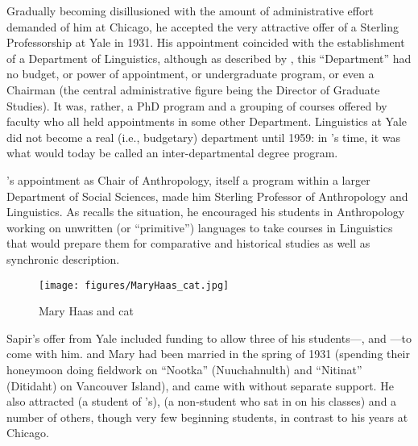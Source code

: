 Gradually becoming disillusioned with the amount of administrative
effort demanded of him at Chicago, he accepted the very attractive
offer of a Sterling Professorship at Yale in 1931. His appointment
coincided with the establishment of a Department of Linguistics,
although as described by \citet{wells74:lx-at-yale}, this
``Department'' had no budget, or power of appointment, or
undergraduate program, or even a Chairman (the central administrative
figure being the Director of Graduate Studies). It was, rather, a PhD
program and a grouping of courses offered by faculty who all held
appointments in some other Department.  Linguistics at Yale did not
become a real (i.e., budgetary) department until 1959: in {\Sapir}'s
time, it was what would today be called an inter-departmental degree
program.

{\Sapir}'s appointment as Chair of Anthropology, itself a program within
a larger Department of Social Sciences, made him Sterling Professor of
Anthropology and Linguistics. As \citet{haas84:sapir.training} recalls
the situation, he encouraged his students in Anthropology working on
unwritten (or ``primitive'') languages to take courses in Linguistics
that would prepare them for comparative and historical studies as well
as synchronic description.

\begin{wrapfigure}{r}{.4\textwidth}
  \texttt{[image: figures/MaryHaas\_cat.jpg]}
  \caption{Mary Haas and cat}
  \label{fig:ch.sapir.haas_cat}
\end{wrapfigure}
Sapir's offer from Yale included funding to allow three of his
students---,  and ---to come
with him. {\Swadesh} and Mary {\Haas} had been married in the spring of 1931
(spending their honeymoon doing fieldwork on ``Nootka'' (Nuuchahnulth)
and ``Nitinat'' (Ditidaht) on Vancouver Island), and {\Haas} came with
{\Swadesh} without separate support. He also attracted  (a
student of {\Kroeber}'s),  (a non-student who sat in on his
classes) and a number of others, though very few beginning students,
in {contrast} to his years at Chicago.

